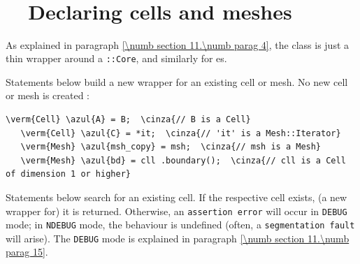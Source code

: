 \section{~~\cinzasec{[empty]}}\label{\numb section 9.\numb parag 9}


\section{~~Declaring cells and meshes}\label{\numb section 9.\numb parag 10}

As explained in paragraph \ref{\numb section 11.\numb parag 4}, the {\small\tt {}} class
is just a thin wrapper around a {\small\tt {}::Core}, and similarly for {\small\tt {}}es.

Statements below build a new wrapper for an existing cell or mesh.
No new cell or mesh is created :

\begin{Verbatim}[commandchars=\\\{\},formatcom=\small\tt,
   baselinestretch=0.94,framesep=2mm                      ]
   \verm{Cell} \azul{A} = B;  \cinza{// B is a Cell}
   \verm{Cell} \azul{C} = *it;  \cinza{// 'it' is a Mesh::Iterator}
   \verm{Mesh} \azul{msh_copy} = msh;  \cinza{// msh is a Mesh}
   \verm{Mesh} \azul{bd} = cll .boundary();  \cinza{// cll is a Cell of dimension 1 or higher}
\end{Verbatim}

Statements below search for an existing cell.
If the respective cell exists, (a new wrapper for) it is returned.
Otherwise, an {\small\tt assertion error} will occur in {\small\tt DEBUG} mode;
in {\small\tt NDEBUG} mode, the behaviour is undefined (often, a {\small\tt segmentation fault}
will arise).
The {\small\tt DEBUG} mode is explained in paragraph \ref{\numb section 11.\numb parag 15}.

